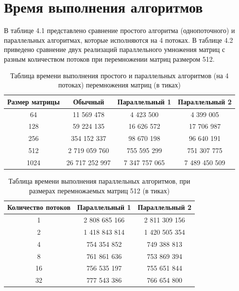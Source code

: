 \documentclass[12pt]{report}
\begin{document}
\section{Время выполнения алгоритмов}

В таблице 4.1 представлено сравнение простого алгоритма (однопоточного) и параллельных алгоритмах, которые исполняются на 4 потоках. В таблице 4.2 приведено сравнение двух реализаций параллельного умножения матриц с разным количеством потоков при перемножении матриц размером 512.

\begin{table} [h!]
	\caption{Таблица времени выполнения простого и параллельных алгоритмов (на 4 потоках) перемножения матриц (в тиках)}
	\begin{center}
		\begin{tabular}{|c c c c|} 
		 	\hline
			Размер матрицы & Обычный & Параллельный 1 & Параллельный 2 \\  
		 	\hline
		 	64 & 11 569 478 & 4 423 500 & 4 399 005 \\
		 	\hline
		 	128 & 59 224 135 & 16 626 572 & 17 706 987 \\
		 	\hline
		 	256 & 354 152 337 & 98 670 198 & 96 640 191\\
		 	\hline
			512 & 2 719 059 760 & 755 595 299 & 751 307 775 \\
			\hline
			1024 & 26 717 252 997 & 7 347 757 065 & 7 489 450 509 \\
			\hline
		\end{tabular}
	\end{center}
\end{table}

\begin{table} [h!]
	\caption{Таблица времени выполнения параллельных алгоритмов, при размерах перемножаемых матриц 512 (в тиках)}
	\begin{center}
		\begin{tabular}{|c c c|} 
			\hline
			Количество потоков & Параллельный 1 & Параллельный 2  \\  
			\hline
			1 & 2 808 685 166 & 2 811 309 156  \\
			\hline
			2 & 1 418 843 814 & 1 420 505 354  \\
			\hline
			4 & 754 354 852 & 749 388 813  \\
			\hline
			8 & 761 861 636 & 753 869 394  \\
			\hline
			16 & 756 535 197 & 755 651 844 \\
			\hline
			32 & 777 543 386 & 766 654 800  \\
			\hline
		\end{tabular}
	\end{center}
\end{table}
\end{document}
